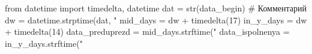 \begin{pycode}	
from datetime import timedelta, datetime
dat = str(data_begin)
# Комментарий
dw = datetime.strptime(dat, "%
mid_days = dw + timedelta(17)
in_y_days = dw + timedelta(14)
data_preduprezd = mid_days.strftime("%
data_ispolnenya = in_y_days.strftime("%
\end{pycode}

%
%
%
%
%
%
